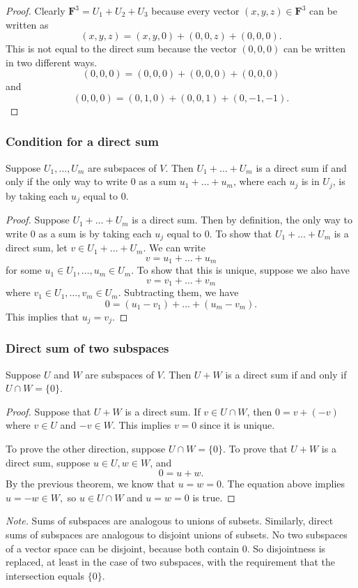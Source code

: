 \documentclass[11pt]{article}
\begin{document}
    \begin{proof}
        Clearly \(\textbf{F}^3 = U_1 + U_2 + U_3\) because every vector \((x,y,z)\in \textbf{F}^3\) can be written as \[(x,y,z) = (x,y,0) + (0,0,z) + (0,0,0).\] This is not equal to the direct sum because the vector \((0,0,0)\) can be written in two different ways. \[(0,0,0) = (0,0,0) + (0,0,0) + (0,0,0)\] and \[(0,0,0) = (0,1,0) + (0,0,1) + (0,-1,-1).\]
    \end{proof}

    \subsubsection{Condition for a direct sum}
    
    Suppose \(U_1, \dots, U_m\) are subspaces of $V$. Then \(U_1 + \dots + U_m\) is a direct sum if and only if the only way to write 0 as a sum \(u_1 + \dots + u_m\), where each \(u_j\) is in \(U_j\), is by taking each \(u_j\) equal to 0.

    \begin{proof}
        Suppose \(U_1 + \dots + U_m\) is a direct sum. Then by definition, the only way to write 0 as a sum is by taking each \(u_j\) equal to 0. To show that \(U_1 + \dots + U_m\) is a direct sum, let \(v \in U_1 + \dots + U_m.\) We can write \[v = u_1 + \dots + u_m\] for some \(u_1 \in U_1, \dots, u_m \in U_m.\) To show that this is unique, suppose we also have \[v = v_1 + \dots + v_m\] where \(v_1 \in U_1, \dots, v_m \in U_m\). Subtracting them, we have \[0 = (u_1 - v_1) + \dots + (u_m - v_m).\] This implies that \(u_j = v_j\). 
    \end{proof}

    \subsubsection{Direct sum of two subspaces}

    Suppose $U$ and $W$ are subspaces of $V$. Then $U+W$ is a direct sum if and only if \(U \cap W = \{0\}\).

    \begin{proof}
        Suppose that $U+W$ is a direct sum. If \(v \in U \cap W\), then \(0 = v + (-v)\) where \(v \in U\) and \(-v \in W\). This implies \(v = 0\) since it is unique. 

        To prove the other direction, suppose \(U \cap W = \{0\}\). To prove that \(U + W\) is a direct sum, suppose \(u \in U, w \in W\), and \[0 = u + w.\] By the previous theorem, we know that \(u = w = 0.\) The equation above implies \(u = -w \in W,\) so \(u \in U \cap W\) and \(u = w = 0\) is true.
    \end{proof}

    \emph{Note.} Sums of subspaces are analogous to unions of subsets. Similarly, direct sums of subspaces are analogous to disjoint unions of subsets. No two subspaces of a vector space can be disjoint, because both contain 0. So disjointness is replaced, at least in the case of two subspaces, with the requirement that the intersection equals \(\{0\}\).
\end{document}
